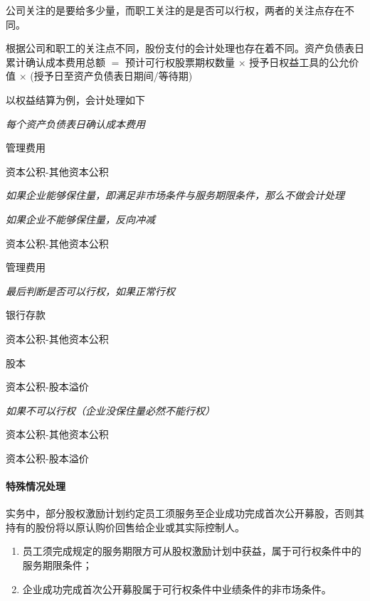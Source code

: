 \documentclass[UTF8,12pt]{ctexart}
\newenvironment{Dr}{%
	\begin{list}{}%
		{
			\setlength{\leftmargin}{2em}
			\setlength{\labelwidth}{2em}
			\setlength{\labelsep}{0pt}
			\setlength{\itemindent}{0pt}
			\setlength{\listparindent}{0pt}
			\setlength{\parsep}{0pt}
			\setlength{\topsep}{0pt}
		}
		\item[\textbf{借：}]
	}{%
	\end{list}
}
\newenvironment{Cr}{%
	\begin{list}{}%
		{
			\setlength{\leftmargin}{3em}
			\setlength{\labelwidth}{2em}
			\setlength{\labelsep}{0pt}
			\setlength{\itemindent}{0pt}
			\setlength{\listparindent}{0pt}
			\setlength{\parsep}{0pt}
			\setlength{\topsep}{0pt}
		}
		\item[\textbf{贷：}]
	}{%
	\end{list}
}
\numberwithin{equation}{section} %
\numberwithin{figure}{section}
\numberwithin{table}{section}
\begin{document}
	公司关注的是要给多少量，而职工关注的是是否可以行权，两者的关注点存在不同。
	
	根据公司和职工的关注点不同，股份支付的会计处理也存在着不同。资产负债表日累计确认成本费用总额 $=$ 预计可行权股票期权数量 $\times$ 授予日权益工具的公允价值 $\times$ (授予日至资产负债表日期间/等待期)
	
	以权益结算为例，会计处理如下
	
	\textit{每个资产负债表日确认成本费用}
	
	\begin{Dr}
		管理费用
	\end{Dr}
	\begin{Cr}
		资本公积-其他资本公积
	\end{Cr}

	\textit{如果企业能够保住量，即满足非市场条件与服务期限条件，那么不做会计处理}
	
	\textit{如果企业不能够保住量，反向冲减}
	
	\begin{Dr}
		资本公积-其他资本公积
	\end{Dr}
	\begin{Cr}
		管理费用
	\end{Cr}

	\textit{最后判断是否可以行权，如果正常行权}
	
	\begin{Dr}
		银行存款
		
		资本公积-其他资本公积
	\end{Dr}
	\begin{Cr}
		股本
		
		资本公积-股本溢价
	\end{Cr}

	\textit{如果不可以行权（企业没保住量必然不能行权）}
	
	\begin{Dr}
		资本公积-其他资本公积
	\end{Dr}
	\begin{Cr}
		资本公积-股本溢价
	\end{Cr}
	
	\paragraph{特殊情况处理}
	实务中，部分股权激励计划约定员工须服务至企业成功完成首次公开募股，否则其持有的股份将以原认购价回售给企业或其实际控制人。
	
	\begin{enumerate}
		\item 员工须完成规定的服务期限方可从股权激励计划中获益，属于可行权条件中的服务期限条件；
		
		\item 企业成功完成首次公开募股属于可行权条件中业绩条件的非市场条件。
	\end{enumerate}
\end{document}
